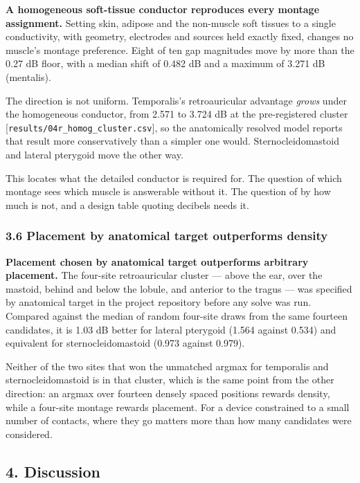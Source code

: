 \documentclass[
  11pt,
  a4paper,
]{article}
\begin{document}
\textbf{A homogeneous soft-tissue conductor reproduces every montage assignment.}
Setting skin, adipose and the non-muscle soft tissues to a single conductivity,
with geometry, electrodes and sources held exactly fixed, changes no muscle's
montage preference. Eight of ten gap magnitudes move by more than the 0.27 dB
floor, with a median shift of 0.482 dB and a maximum of 3.271 dB (mentalis).

The direction is not uniform. Temporalis's retroauricular advantage \emph{grows}
under the homogeneous conductor, from \textminus{}2.571 to \textminus{}3.724 dB at the pre-registered
cluster {[}\texttt{results/04r\_homog\_cluster.csv}{]}, so the anatomically resolved model
reports that result more conservatively than a simpler one would.
Sternocleidomastoid and lateral pterygoid move the other way.

This locates what the detailed conductor is required for. The question of
which montage sees which muscle is answerable without it. The question of by
how much is not, and a design table quoting decibels needs it.

\subsubsection{3.6 Placement by anatomical target outperforms density}\label{placement-by-anatomical-target-outperforms-density}

\textbf{Placement chosen by anatomical target outperforms arbitrary placement.} The
four-site retroauricular cluster --- above the ear, over the mastoid, behind and
below the lobule, and anterior to the tragus --- was specified by anatomical
target in the project repository before any solve was run. Compared against
the median of random four-site draws from the same fourteen candidates, it is
1.03 dB better for lateral pterygoid (\textminus{}1.564 against \textminus{}0.534) and equivalent
for sternocleidomastoid (\textminus{}0.973 against \textminus{}0.979).

Neither of the two sites that won the unmatched argmax for temporalis and
sternocleidomastoid is in that cluster, which is the same point from the other
direction: an argmax over fourteen densely spaced positions rewards density,
while a four-site montage rewards placement. For a device constrained to a
small number of contacts, where they go matters more than how many candidates
were considered.

\subsection{4. Discussion}\label{discussion}
\end{document}
